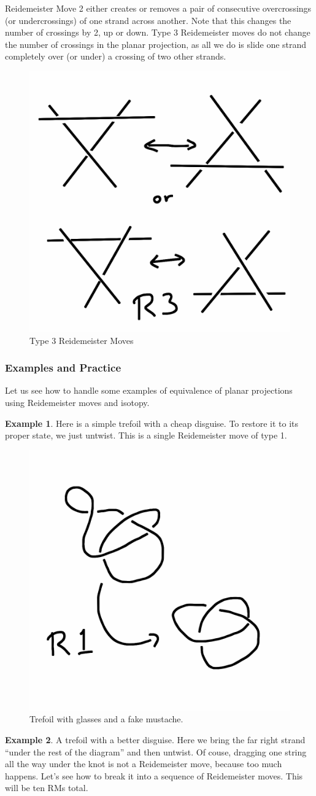 \documentclass[12pt,letterpaper]{article}
\theoremstyle{definition}
\newtheorem{example}{Example}
\begin{document}
Reidemeister Move 2 either creates or removes a pair of consecutive overcrossings (or undercrossings) of one strand across another.
Note that this changes the number of crossings by 2, up or down.
Type 3 Reidemeister moves do not change the number of crossings in the planar projection, as all we do is slide one strand completely over (or under) a crossing of two other strands. 

\begin{figure}[ht]
    \centering
    \includegraphics[width=.25\textwidth]{knotpics/r3.png}
    \caption{Type 3 Reidemeister Moves}
\end{figure}


\clearpage

\subsubsection*{Examples and Practice}

Let us see how to handle some examples of equivalence of planar projections using Reidemeister moves and isotopy.

\begin{example}
Here is a simple trefoil with a cheap disguise.
To restore it to its proper state, we just untwist. This is a single Reidemeister move of type 1.
\end{example}

\begin{figure}[h]
    \centering
    \includegraphics[width=.3\textwidth]{knotpics/trefoil-bad-disguise.png}
    \caption{Trefoil with glasses and a fake mustache.}
\end{figure}

\begin{example}
A trefoil with a better disguise.
Here we bring the far right strand ``under the rest of the diagram'' and then untwist. Of couse, dragging one string all the way under the knot is not a Reidemeister move, because too much happens. Let's see how to break it into a sequence of Reidemeister moves. This will be ten RMs total.
\end{example}
\end{document}
